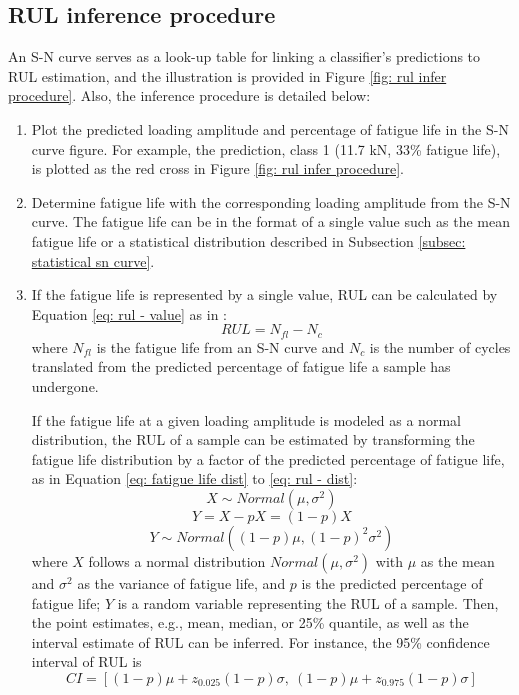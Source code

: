 \subsection{RUL inference procedure}
An S-N curve serves as a look-up table for linking a classifier's predictions to RUL estimation, and the illustration is provided in Figure \ref{fig: rul infer procedure}. Also, the inference procedure is detailed below:
\begin{enumerate}
    \item Plot the predicted loading amplitude and percentage of fatigue life in the S-N curve figure. For example, the prediction, class 1 (11.7 kN, 33\% fatigue life), is plotted as the red cross in Figure \ref{fig: rul infer procedure}.
    \item Determine fatigue life with the corresponding loading amplitude from the S-N curve. The fatigue life can be in the format of a single value such as the mean fatigue life or a statistical distribution described in Subsection \ref{subsec: statistical sn curve}.
    \item If the fatigue life is represented by a single value, RUL can be calculated by Equation \eqref{eq: rul - value} as in \cite{rul-nn-eol-MAZHAR20071184}: 
    \begin{equation}
        \label{eq: rul - value}
        RUL = N_{fl} - N_{c}
    \end{equation}
    where $N_{fl}$ is the fatigue life from an S-N curve and $N_c$ is the number of cycles translated from the predicted percentage of fatigue life a sample has undergone.

    If the fatigue life at a given loading amplitude is modeled as a normal distribution, the RUL of a sample can be estimated by transforming the fatigue life distribution by a factor of the predicted percentage of fatigue life, as in Equation \eqref{eq: fatigue life dist} to \eqref{eq: rul - dist}:
    \begin{equation}
        \label{eq: fatigue life dist}
        X \sim Normal(\mu, \sigma^2)
    \end{equation}
    \begin{equation}
        \label{eq: rul transform}
        Y = X - pX = (1 - p)X
    \end{equation}
    \begin{equation}
        \label{eq: rul - dist}
        Y \sim Normal((1-p)\mu, (1-p)^2\sigma^2)
    \end{equation}
    where $X$ follows a normal distribution $Normal (\mu, \sigma^2)$ with $\mu$ as the mean and $\sigma^2$ as the variance of fatigue life, and $p$ is the predicted percentage of fatigue life; $Y$ is a random variable representing the RUL of a sample. Then, the point estimates, e.g., mean, median, or 25\% quantile, as well as the interval estimate of RUL can be inferred. For instance, the 95\% confidence interval of RUL is
    \begin{equation}
        CI = [(1-p)\mu + z_{0.025} (1-p) \sigma,\ (1-p)\mu + z_{0.975} (1-p) \sigma]
    \end{equation}
\end{enumerate}

